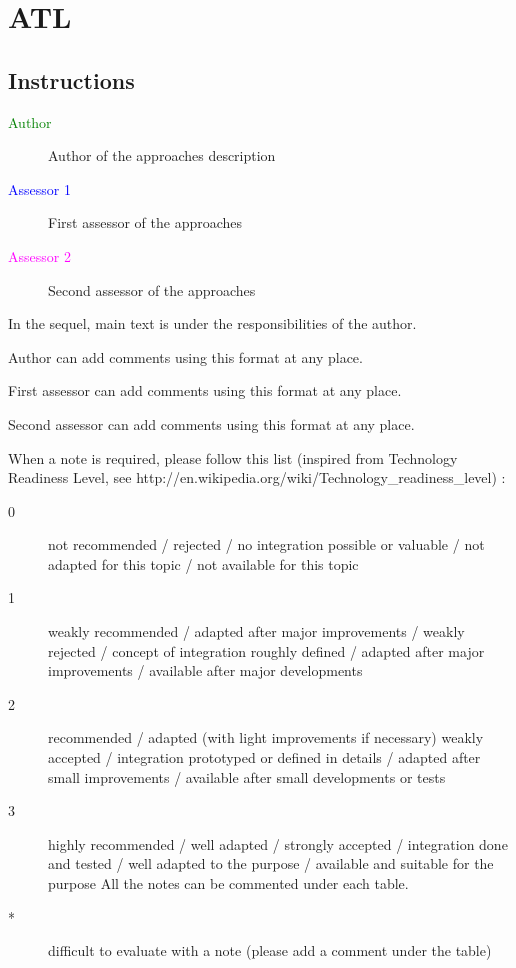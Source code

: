 \chapter{ATL}
\label{sec:atl}

\section{Instructions}

\begin{description}
\item[\textcolor{green}{Author}] Author of the approaches description  
\item[\textcolor{blue}{Assessor 1}] First assessor of the approaches 
\item[\textcolor{magenta}{Assessor 2}] Second assessor of the approaches 
\end{description}

In the sequel, main text is under the responsibilities of the author.

\begin{author_comment}
Author can add comments using this format at any place.
\end{author_comment}

\begin{assessor1}
First assessor can add comments using this format at any place.
\end{assessor1}

\begin{assessor2}
Second assessor can add comments using this format at any place.
\end{assessor2}


When a note is required, please follow this list (inspired from Technology Readiness Level, see http://en.wikipedia.org/wiki/Technology\_readiness\_level) :

\begin{description}
\item[0] not recommended / rejected / no integration possible or valuable / not adapted for this topic / not available for this topic
\item[1] weakly recommended / adapted after major improvements / weakly rejected / concept of integration roughly defined / adapted after major improvements / available after major developments
\item[2] recommended / adapted (with light improvements if necessary)  weakly accepted / integration prototyped or defined in details / adapted after small improvements / available after small developments or tests
\item[3] highly recommended / well adapted / strongly accepted / integration done and tested / well adapted to the purpose / available and suitable for the purpose All the notes can be commented under each table.
\item[*] difficult to evaluate with a note (please add a comment under the table)
\end{description}

